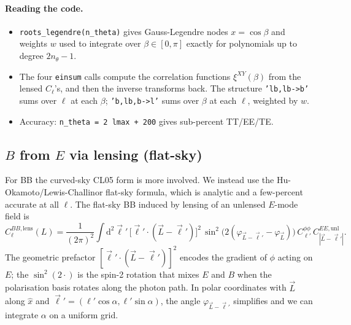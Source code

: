 \paragraph{Reading the code.}
\begin{itemize}
  \item \texttt{roots\_legendre(n\_theta)} gives Gauss-Legendre nodes $x = \cos\beta$ and weights $w$ used to integrate over $\beta \in [0, \pi]$ exactly for polynomials up to degree $2n_\theta - 1$.
  \item The four \texttt{einsum} calls compute the correlation functions $\xi^{XY}(\beta)$ from the lensed $C_\ell$'s, and then the inverse transforms back. The structure \texttt{'lb,lb->b'} sums over $\ell$ at each $\beta$; \texttt{'b,lb,b->l'} sums over $\beta$ at each $\ell$, weighted by $w$.
  \item Accuracy: \texttt{n\_theta = 2 lmax + 200} gives sub-percent TT/EE/TE.
\end{itemize}

\subsection{$B$ from $E$ via lensing (flat-sky)}

For BB the curved-sky CL05 form is more involved. We instead use the Hu-Okamoto/Lewis-Challinor flat-sky formula, which is analytic and a few-percent accurate at all $\ell$. The flat-sky BB induced by lensing of an unlensed $E$-mode field is
\begin{equation}
  C_\ell^{BB,\mathrm{lens}}(L) = \frac{1}{(2\pi)^2}\int\!\mathrm{d}^2\vec\ell'\,
        \bigl[\vec\ell' \!\cdot\! (\vec L - \vec\ell')\bigr]^2\,
        \sin^2\!\bigl(2(\varphi_{\vec L - \vec\ell'} - \varphi_{\vec L})\bigr)\,
        C^{\phi\phi}_{\ell'}\,
        C^{EE,\mathrm{unl}}_{|\vec L - \vec\ell'|}.
  \label{eq:BB_flat_sky}
\end{equation}
The geometric prefactor $[\vec \ell' \cdot (\vec L - \vec\ell')]^2$ encodes the gradient of $\phi$ acting on $E$; the $\sin^2(2\cdot)$ is the spin-2 rotation that mixes $E$ and $B$ when the polarisation basis rotates along the photon path. In polar coordinates with $\vec L$ along $\hat x$ and $\vec\ell' = (\ell'\cos\alpha, \ell'\sin\alpha)$, the angle $\varphi_{\vec L - \vec\ell'}$ simplifies and we can integrate $\alpha$ on a uniform grid.

